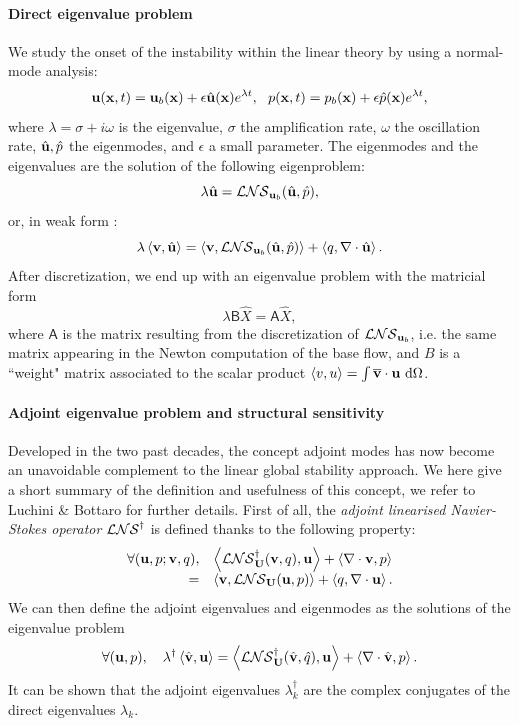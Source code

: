 \documentclass[twocolumn,10pt]{asme2ej}
\newcommand{\be}[1]{ \begin{equation} \label{#1}}
\newcommand{\ee}{\end{equation}}
\newcommand{\bes}[1]{ \begin{equation} \label{#1}\begin{array}{rl}}
\newcommand{\ees}{\end{array}\end{equation}}
\begin{document}
\paragraph{Direct eigenvalue problem}
We study the onset of the instability within the linear theory by using a normal-mode analysis:
\be{startmodepropre}
{\bf u} ({\bf{x}},t) = {\bf u}_b({\bf{x}}) + \epsilon \hat{\bf u}({\bf{x}}) e^{\lambda t}, \,\,\,\, {p}({\bf{x}},t) = {p}_b({\bf{x}}) + \epsilon \hat{p}({\bf{x}}) e^{\lambda t},
\ee
where $\lambda = \sigma + i \omega$ is the eigenvalue, $\sigma$ the amplification rate,
$\omega$ the oscillation rate, $\hat{{\bf u}},\hat{p}$ the eigenmodes, and $\epsilon$ a small parameter.
The eigenmodes and the eigenvalues are the solution of the following eigenproblem:
 \be{LEP}
\lambda \hat{{\bf u}} = {\cal LNS}_{{\bf u}_b}( \hat{\bf u},\hat{p}),
\ee
or, in weak form : 
\be{eigenvalueproblem}
\lambda \left< {\bf v} , \hat{{\bf u}} \right> = \left< {\bf v}, {\cal LNS}_{{\bf u}_b} ( \hat{\bf u},\hat{p})\right> + \left< q, \nabla \cdot \hat{\bf u} \right>.
\ee
After discretization, we end up with an eigenvalue problem with the matricial form
\be{Eigen_matricial}
\lambda {\mathsf{B}} \hat{X} = {\mathsf{A}} \hat{X},
\ee
where ${\mathsf{A}}$ is the matrix resulting from the discretization of ${\cal LNS}_{{\bf u}_b}$, i.e. the same matrix  appearing in the Newton computation of the base flow, and  $B$ is a ``weight" matrix associated to the scalar product $\left<v,u\right> = \int \overline{\bf v} \cdot {\bf u} \mbox{ d} \Omega$.

\paragraph{Adjoint eigenvalue problem and structural sensitivity}
Developed in the two past decades, the concept adjoint modes has now become an unavoidable complement to the linear global stability approach. We here give a short summary of the definition and usefulness of this concept, 
we refer to Luchini \& Bottaro\cite{LucBott2014} for further details.
First of all, the {\em adjoint linearised Navier-Stokes operator} ${\cal LNS}^\dag$ is defined thanks to the following 
property:
\bes{NSLAdj}
\forall ( {\bf u}, p ; {\bf v}, q), & \left< {\cal LNS}^\dag_{\bf U}( {\bf v},q) ,{\bf u}\right> + \left< \nabla \cdot {\bf v},p\right>  \\
=& \left< {\bf v}, {\cal LNS}_{\bf U} ({\bf u},p)\right> + \left< q, \nabla \cdot {\bf u}\right>.
\ees
We can then define the adjoint eigenvalues and eigenmodes as the solutions of the eigenvalue problem 
\be{EigenAdj} 
\forall ( {\bf u}, p), \quad  \lambda^\dag \left< \hat{\bf v}, {\bf u}\right> =
 \left< {\cal LNS}^\dag_{\bf U}( \hat{\bf v},\hat{q}) ,{\bf u}\right> + \left< \nabla \cdot \hat{\bf v},p\right> . 
\ee
It can be shown \cite{SchmidHenningson2001} that the adjoint eigenvalues $\lambda^\dag_k$ are the complex conjugates of the direct eigenvalues $\lambda_k$. 
\end{document}
